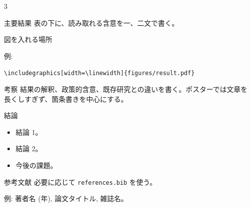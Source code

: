 \documentclass[12pt,dvipdfmx]{jsarticle}
\begin{document}
\begin{multicols}{3}
\begin{posterblock}{主要結果}
表の下に、読み取れる含意を一、二文で書く。
\end{posterblock}

\begin{posterblock}{図を入れる場所}
\begin{center}
\end{center}

例:
\begin{center}
\texttt{\textbackslash includegraphics[width=\textbackslash linewidth]\{figures/result.pdf\}}
\end{center}
\end{posterblock}

\begin{posterblock}{考察}
結果の解釈、政策的含意、既存研究との違いを書く。ポスターでは文章を長くしすぎず、箇条書きを中心にする。
\end{posterblock}

\begin{posterblock}{結論}
\begin{itemize}
  \item 結論 1。
  \item 結論 2。
  \item 今後の課題。
\end{itemize}
\end{posterblock}

\begin{posterblock}{参考文献}
必要に応じて \texttt{references.bib} を使う。

\vspace{3mm}
例: 著者名 (年), 論文タイトル, 雑誌名。
\end{posterblock}

\end{multicols}
\end{document}
